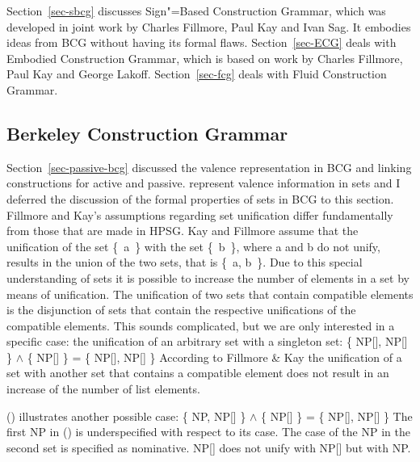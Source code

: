 Section~\ref{sec-sbcg} discusses Sign"=Based Construction Grammar, which was developed in joint work
by Charles Fillmore, Paul Kay and Ivan Sag. It embodies ideas from BCG without having its formal flaws. Section~\ref{sec-ECG} deals with
Embodied Construction Grammar, which is based on work by Charles Fillmore, Paul Kay and George
Lakoff. Section~\ref{sec-fcg} deals with Fluid Construction Grammar.


\subsection{Berkeley Construction Grammar}
\label{sec-formal-bcg}

Section~\ref{sec-passive-bcg} discussed the valence representation in BCG and linking constructions for active and
passive.  represent valence information in sets
and I deferred the discussion of the formal properties of sets in BCG to this section.
Fillmore and Kay's assumptions regarding set unification differ fundamentally from those that are
made in HPSG. Kay and Fillmore assume that the unification of the set \{~a~\} with the set  \mbox{\{ b \}},
where a and b do not unify, results in the union of the two sets, that is \{~a, b~\}. Due to this
special understanding of sets it is possible to increase the number of elements in a set by means of
unification. The unification of two sets that contain compatible elements is the disjunction of sets
that contain the respective unifications of the compatible elements. This sounds complicated, but we
are only interested in a specific case: the unification of an arbitrary set with a singleton set:
\ea
\{ NP[], NP[] \} $\wedge$ \{ NP[] \} = \{ NP[], NP[] \}
\z
According to Fillmore \& Kay the unification of a set with another set that contains a compatible
element does not result in an increase of the number of list elements.

() illustrates another possible case:
\ea
\{ NP, NP[] \} $\wedge$ \{ NP[] \} = \{ NP[], NP[] \}
\z
The first NP in () is underspecified with respect to its case. The case of the NP in the
second set is specified as nominative. NP[] does not unify with NP[] but with NP.

